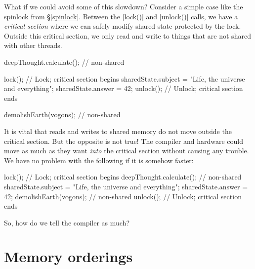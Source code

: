 \documentclass[fontsize=10pt, oneside]{scrartcl}
\newcommand{\introduce}[1]{\textit{#1}}
\newcommand{\secref}[1]{\hyperref[#1]{\textsc{\S}\ref*{#1}}}
\begin{document}
What if we could avoid some of this slowdown?
Consider a simple case like the spinlock from \secref{spinlock}.
Between the \cc|lock()| and \cc|unlock()| calls,
we have a \introduce{critical section} where we can safely modify shared state protected by the lock.
Outside this critical section,
we only read and write to things that are not shared with other threads.
\begin{cppcode}
deepThought.calculate(); // non-shared

lock(); // Lock; critical section begins
sharedState.subject = "Life, the universe and everything";
sharedState.answer = 42;
unlock(); // Unlock; critical section ends

demolishEarth(vogons); // non-shared
\end{cppcode}

It is vital that reads and writes to shared memory do not move outside the critical section.
But the opposite is not true!
The compiler and hardware could move as much as they want \emph{into} the critical section without causing any trouble.
We have no problem with the following if it is somehow faster:
\begin{cppcode}
lock(); // Lock; critical section begins
deepThought.calculate(); // non-shared
sharedState.subject = "Life, the universe and everything";
sharedState.answer = 42;
demolishEarth(vogons); // non-shared
unlock(); // Unlock; critical section ends
\end{cppcode}
So, how do we tell the compiler as much?

\section{Memory orderings}
\end{document}
